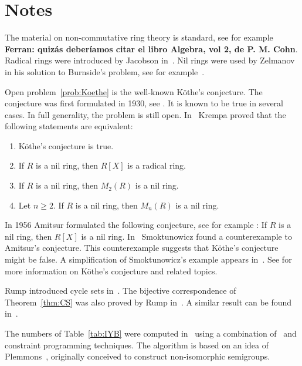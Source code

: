 \section*{Notes}

The material on non-commutative ring theory is standard, see for example~\cite{MR3308118} {\bf Ferran: quiz\'as deber\'{i}amos citar el libro Algebra, vol 2, de P. M. Cohn}.
Radical rings were introduced by Jacobson in~\cite{MR12271}. Nil rings were
used by Zelmanov in his solution to Burnside's problem, see for example~\cite{MR1199575}. 

Open problem~\ref{prob:Koethe} is the well-known K\"othe's conjecture. 
The conjecture was first formulated in 1930, see \cite{MR1545158}. It is known to be true
in several cases. In full generality, the problem is still open. In~\cite{MR306251} 
Krempa proved that
the following statements are equivalent:
\begin{enumerate}
	\item K\"othe's conjecture is true.  
	\item If $R$ is a nil ring, then $R[X]$ is a radical ring. 
	\item If $R$ is a nil ring, then $M_2(R)$ is a nil ring. 
	\item Let $n\geq2$. If $R$ is a nil ring, then $M_n(R)$ is a nil ring. 
\end{enumerate}

In 1956 Amitsur formulated the following conjecture, see for example
\cite{MR0347873}: If $R$ is a nil ring, then $R[X]$ is a nil ring. In~\cite{MR1793911} 
Smoktunowicz found a counterexample to Amitsur's conjecture. 
This counterexample suggests that K\"othe's conjecture might be false. 
A simplification of Smoktunowicz's example
appears in~\cite{MR3169522}. See \cite{MR1879880,MR2275597} for more
information on K\"othe's conjecture and related topics. 


Rump introduced cycle sets in~\cite{MR2132760}. The bijective correspondence of 
Theorem~\ref{thm:CS} was 
also proved by Rump in~\cite{MR2132760}. A similar result can be 
found in~\cite[Proposition 2.2]{MR1722951}. 

The numbers of Table~\ref{tab:IYB} were computed in~\cite{AMV}
using a combination of~\cite{GAP4} and constraint programming techniques. 
The algorithm is based on an idea of Plemmons~\cite{MR0258994}, originally 
conceived to construct non-isomorphic semigroups.  

